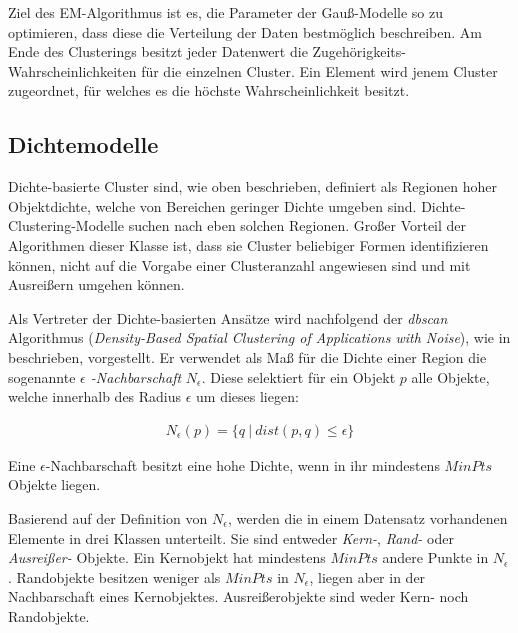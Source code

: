 Ziel des EM-Algorithmus ist es, die Parameter der Gauß-Modelle so zu optimieren, dass diese die Verteilung
der Daten bestmöglich beschreiben. Am Ende des Clusterings besitzt jeder Datenwert die Zugehörigkeits-Wahrscheinlichkeiten
für die einzelnen Cluster. Ein Element wird jenem Cluster zugeordnet, für welches es die höchste
Wahrscheinlichkeit besitzt.

\subsection{Dichtemodelle}
\label{sec:grund_density_clustering}

Dichte-basierte Cluster sind, wie oben beschrieben, definiert als Regionen hoher Objektdichte, welche
von Bereichen geringer Dichte umgeben sind. Dichte-Clustering-Modelle suchen nach eben solchen Regionen.
Großer Vorteil der Algorithmen dieser Klasse ist, dass sie Cluster beliebiger Formen identifizieren können,
nicht auf die Vorgabe einer Clusteranzahl angewiesen sind und mit Ausreißern umgehen können.

Als Vertreter der Dichte-basierten Ansätze wird nachfolgend der \textit{\acrshort*{dbscan}} Algorithmus
(\textit{Density-Based Spatial Clustering of Applications with Noise}), wie in \cite[]{Gao2012} beschrieben, vorgestellt.
Er verwendet als Maß für die Dichte einer Region die sogenannte \textit{$\epsilon$ -Nachbarschaft} $N_{\epsilon}$.
Diese selektiert für ein Objekt $p$ alle Objekte, welche innerhalb des Radius $\epsilon$ um dieses liegen:

\begin{ceqn}
\begin{align}
    \label{eq_dbscan_1}
    N_{\epsilon}(p) = \{ q\ |\ dist(p,q) \leq \epsilon \}
\end{align}
\end{ceqn}

Eine $\epsilon$-Nachbarschaft besitzt eine hohe Dichte, wenn in ihr mindestens $MinPts$ Objekte liegen.

Basierend auf der Definition von $N_{\epsilon}$, werden die in einem Datensatz vorhandenen Elemente in
drei Klassen unterteilt. Sie sind entweder \textit{Kern-}, \textit{Rand-} oder \textit{Ausreißer-} Objekte.
Ein Kernobjekt hat mindestens $MinPts$ andere Punkte in $N_{\epsilon}$.
Randobjekte besitzen weniger als $MinPts$ in $N_{\epsilon}$, liegen aber in der Nachbarschaft eines Kernobjektes.
Ausreißerobjekte sind weder Kern- noch Randobjekte.

